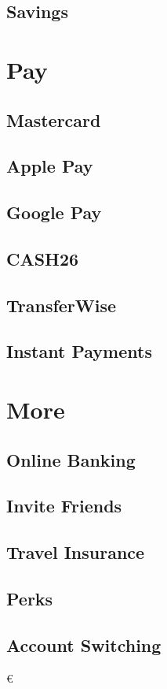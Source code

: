\documentclass[onsided]{book}
\numberwithin{equation}{section}
\begin{document}
\section{Savings}


\chapter{Pay}

\section{Mastercard}

\section{Apple Pay}

\section{Google Pay}

\section{CASH26}

\section{TransferWise}

\section{Instant Payments}


\chapter{More}

\section{Online Banking}

\section{Invite Friends}

\section{Travel Insurance}

\section{Perks}

\section{Account Switching}



€


\printbibliography[heading=bibintoc]
\end{document}
